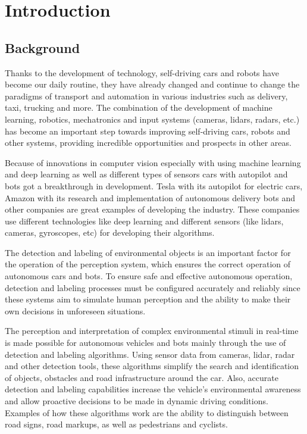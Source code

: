 \section{Introduction}
\subsection{Background}

Thanks to the development of technology, self-driving cars and robots have become our daily routine, they have already changed and continue to change
the paradigms of transport and automation in various industries such as delivery, taxi, trucking and more.
The combination of the development of machine learning, robotics, mechatronics and input systems (cameras, lidars, radars, etc.) has become an important step towards
improving self-driving cars, robots and other systems, providing incredible opportunities and prospects in other areas.

Because of innovations in computer vision especially with using machine learning and deep learning as well as different types of sensors cars with autopilot and 
bots got a breakthrough in development.
Tesla with its autopilot for electric cars, Amazon with its research and implementation of autonomous delivery bots and other companies are great examples
of developing the industry.
These companies use different technologies like deep learning and different sensors (like lidars, cameras, gyroscopes, etc) for developing their algorithms.

The detection and labeling of environmental objects is an important factor for the operation of the perception system, which ensures the correct 
operation of autonomous cars and bots. To ensure safe and effective autonomous operation, detection and labeling processes must be configured accurately 
and reliably since these systems aim to simulate human perception and the ability to make their own decisions in unforeseen situations.

The perception and interpretation of complex environmental stimuli in real-time is made possible for autonomous vehicles and bots mainly through the use of 
detection and labeling algorithms. Using sensor data from cameras, lidar, radar and other detection tools, these algorithms simplify the search and identification 
of objects, obstacles and road infrastructure around the car. Also, accurate detection and labeling capabilities increase the vehicle's environmental awareness and 
allow proactive decisions to be made in dynamic driving conditions. Examples of how these algorithms work are the ability to distinguish between road signs,
road markups, as well as pedestrians and cyclists.

